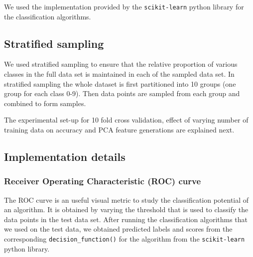 \documentclass[10pt]{scrartcl}
\begin{document}
We used the implementation provided by the \texttt{scikit-learn} python library for the classification algorithms.

\subsection*{Stratified sampling}
We used stratified sampling to ensure that the relative proportion of various classes in the full data set is maintained in each of the sampled
data set. In stratified sampling the whole dataset is first partitioned into 10 groups (one group for each class 0-9). 
Then data points are sampled from each group and combined to form samples.

The experimental set-up for 10 fold cross validation, effect of varying number of training data on accuracy and PCA feature generations are explained next.

\subsection*{Implementation details}

\subsubsection*{Receiver Operating Characteristic (ROC) curve}
The ROC curve is an useful visual metric to study the classification potential of an algorithm. It is obtained by varying the threshold that is used to classify the data points in the test data set. After running the classification algorithms that we used on the test data, we obtained predicted labels and scores from the corresponding \texttt{decision\_function()} for the algorithm from the \texttt{scikit-learn} python library.
\end{document}
